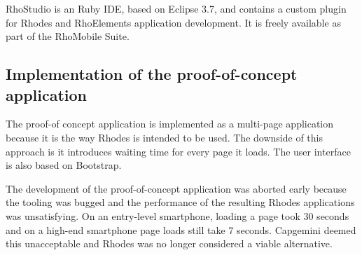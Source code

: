 RhoStudio is an Ruby IDE, based on Eclipse 3.7, and contains a custom plugin for Rhodes and RhoElements application development. It is freely available as part of the RhoMobile Suite.

\subsection{Implementation of the proof-of-concept application}

The proof-of concept application is implemented as a multi-page application because it is the way Rhodes is intended to be used. The downside of this approach is it introduces waiting time for every page it loads. The user interface is also based on Bootstrap.

The development of the proof-of-concept application was aborted early because the tooling was bugged and the performance of the resulting Rhodes applications was unsatisfying. On an entry-level smartphone, loading a page took 30 seconds and on a high-end smartphone page loads still take 7 seconds. Capgemini deemed this unacceptable and Rhodes was no longer considered a viable alternative.